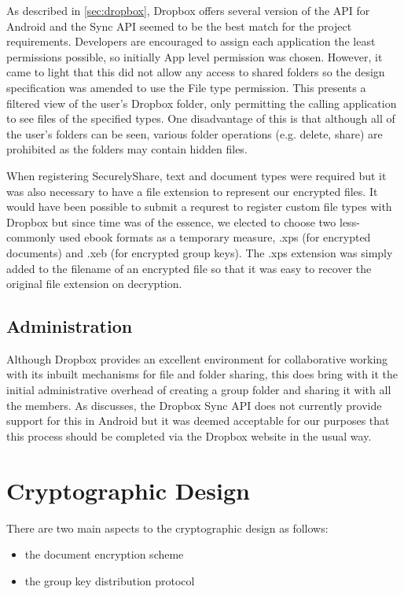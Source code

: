 As described in \ref{sec:dropbox}, Dropbox offers several version of the API for Android and the Sync API seemed to be the best match for the project requirements.  Developers are encouraged to assign each application the least permissions possible, so initially App level permission was chosen.  However, it came to light that this did not allow any access to shared folders so the design specification was amended to use the File type permission.  This presents a filtered view of the user's Dropbox folder, only permitting the calling application to see files of the specified types.  One disadvantage of this is that although all of the user's folders can be seen, various folder operations (e.g. delete, share) are prohibited as the folders may contain hidden files.  

When registering SecurelyShare, text and document types were required but it was also necessary to have a file extension to represent our encrypted files.  It would have been possible to submit a requrest to register custom file types with Dropbox but since time was of the essence, we elected to choose two less-commonly used ebook formats as a temporary measure, .xps (for encrypted documents) and .xeb (for encrypted group keys).  The .xps extension was simply added to the filename of an encrypted file so that it was easy to recover the original file extension on decryption.
\subsection*{Administration}
Although Dropbox provides an excellent environment for collaborative working with its inbuilt mechanisms for file and folder sharing, this does bring with it the initial administrative overhead of creating a group folder and sharing it with all the members.  As discusses, the Dropbox Sync API does not currently provide support for  this in Android but it was deemed acceptable for our purposes that this process should be completed via the Dropbox website in the usual way.  

\section{Cryptographic Design}
\label{sec:crypto}

There are two main aspects to the cryptographic design as follows:
\begin{itemize}
\item the document encryption scheme
\item the group key distribution protocol
\end{itemize} 
